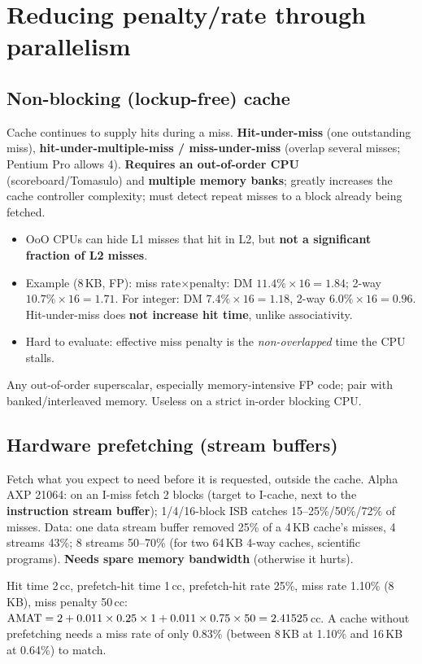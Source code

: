 \section{Reducing penalty/rate through parallelism}
\subsection{Non-blocking (lockup-free) cache}
Cache continues to supply hits during a miss. \textbf{Hit-under-miss} (one outstanding miss), \textbf{hit-under-multiple-miss / miss-under-miss} (overlap several misses; Pentium Pro allows 4). \textbf{Requires an out-of-order CPU} (scoreboard/Tomasulo) and \textbf{multiple memory banks}; greatly increases the cache controller complexity; must detect repeat misses to a block already being fetched.
\begin{itemize}
\item OoO CPUs can hide L1 misses that hit in L2, but \textbf{not a significant fraction of L2 misses}.
\item Example (8\,KB, FP): miss rate$\times$penalty: DM $11.4\%\times16=1.84$; 2-way $10.7\%\times16=1.71$. For integer: DM $7.4\%\times16=1.18$, 2-way $6.0\%\times16=0.96$. Hit-under-miss does \textbf{not increase hit time}, unlike associativity.
\item Hard to evaluate: effective miss penalty is the \emph{non-overlapped} time the CPU stalls.
\end{itemize}
\begin{pick}
Any out-of-order superscalar, especially memory-intensive FP code; pair with banked/interleaved memory. Useless on a strict in-order blocking CPU.
\end{pick}

\subsection{Hardware prefetching (stream buffers)}
Fetch what you expect to need before it is requested, outside the cache. Alpha AXP 21064: on an I-miss fetch 2 blocks (target to I-cache, next to the \textbf{instruction stream buffer}); 1/4/16-block ISB catches 15--25\%/50\%/72\% of misses. Data: one data stream buffer removed 25\% of a 4\,KB cache's misses, 4 streams 43\%; 8 streams 50--70\% (for two 64\,KB 4-way caches, scientific programs). \textbf{Needs spare memory bandwidth} (otherwise it hurts).
\begin{ex}[Slide]
Hit time 2\,cc, prefetch-hit time 1\,cc, prefetch-hit rate 25\%, miss rate 1.10\% (8\,KB), miss penalty 50\,cc:\\
$\mathrm{AMAT}=2+0.011\times0.25\times1+0.011\times0.75\times50=2.41525$\,cc. A cache without prefetching needs a miss rate of only 0.83\% (between 8\,KB at 1.10\% and 16\,KB at 0.64\%) to match.
\end{ex}

